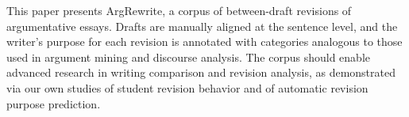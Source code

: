 This paper presents ArgRewrite, a corpus of between-draft revisions of argumentative essays. Drafts are manually aligned at the sentence level, and the writer's purpose for each revision is annotated with categories analogous to those used in argument mining and discourse analysis. The corpus should enable advanced research in writing comparison and revision analysis, as demonstrated via our own studies of student revision behavior and of automatic revision purpose prediction.
